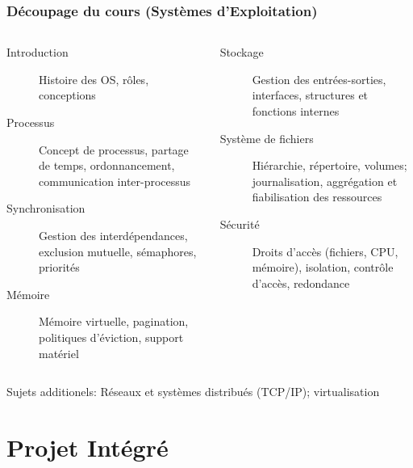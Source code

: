 \documentclass[compress,aspectratio=169]{beamer}
\begin{document}
\begin{frame}
  \frametitle{D\'ecoupage du cours (Syst\`emes d'Exploitation)}

  \begin{columns}
    \begin{column}{.45\linewidth}
      \begin{description}
      \item[Introduction] {\footnotesize Histoire des OS, r\^oles, conceptions}
      \item[Processus] {\footnotesize Concept de processus, partage de temps, ordonnancement, communication inter-processus}
      \item[Synchronisation] {\footnotesize Gestion des interd\'ependances, exclusion mutuelle, s\'emaphores, priorit\'es}
      \item[M\'emoire] {\footnotesize M\'emoire virtuelle, pagination, politiques d'\'eviction, support mat\'eriel}
      \end{description}
    \end{column}\begin{column}{.45\linewidth}
      \begin{description}
      \item[Stockage] {\footnotesize Gestion des entr\'ees-sorties, interfaces, structures et fonctions internes}
      \item[Syst\`eme de fichiers] {\footnotesize Hi\'erarchie, r\'epertoire, volumes; journalisation, aggr\'egation et fiabilisation des ressources}
      \item[S\'ecurit\'e] {\footnotesize Droits d'acc\`es (fichiers, CPU, m\'emoire), isolation, contr\^ole d'acc\`es, redondance}
      \end{description}
    \end{column}
  \end{columns}

  \smallskip
  
  Sujets additionels: R\'eseaux et syst\`emes distribu\'es (TCP/IP); virtualisation
\end{frame}
  
\section{Projet Int\'egr\'e}
\end{document}
